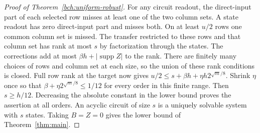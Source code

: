 \begin{proof}[Proof of Theorem~\ref{bch:uniform-robust}]
For any circuit readout, the direct-input part of each selected row
misses at least one of the two column sets. A state readout has zero
direct-input part and misses both. On at least $u/2$ rows one common
column set is missed. The transfer restricted to these rows and that
column set has rank at most $s$ by factorization through the states.
The corrections add at most $\beta h+|\operatorname{supp} Z|$ to
the rank. There are finitely many choices of rows and column set at
each size, so the union of these rank conditions is closed. Full row
rank at the target now gives $u/2\le s+\beta h+\eta h2^{\sqrt m/8}$.
Shrink $\eta$ once so that $\beta+\eta 2^{\sqrt m/8}\le1/12$ for
every order in this finite range. Then $s\ge h/12$. Decreasing the
absolute constant in the lower bound proves the assertion at all orders.
An acyclic circuit of size $s$ is a uniquely solvable system with $s$
states. Taking $B=Z=0$ gives the lower bound of Theorem~\ref{thm:main}.
\end{proof}

